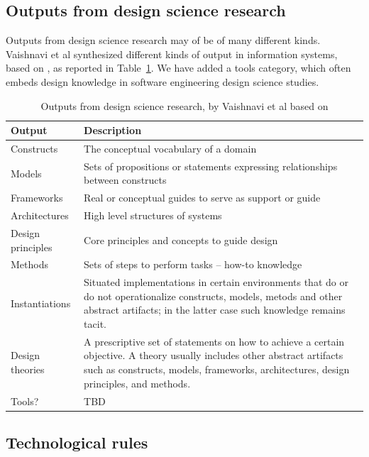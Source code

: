 \documentclass[graybox]{svmult}
\begin{document}
\subsection{Outputs from design science research}
\label{sec:outputs}
Outputs from design science research may of be of many different kinds. Vaishnavi et al \cite{Vaishnavi} synthesized different kinds of output in information systems, based on \cite{March1995} \cite{gregor_positioning_2013}, as reported in Table~\ref{tab:output}. We have added a tools category, which often embeds design knowledge in software engineering design science studies. 
\begin{table}[t]
\caption{Outputs from design science research, by Vaishnavi et al \cite{Vaishnavi} based on \cite{March1995} \cite{gregor_positioning_2013}}
\begin{center}
\begin{tabular}{lp{8cm}}
\textbf{Output}& \textbf{Description}\\
\hline
Constructs & The conceptual vocabulary of a domain\\
Models & Sets of propositions or statements expressing relationships between constructs\\
Frameworks & Real or conceptual guides to serve as support or guide\\
Architectures & High level structures of systems\\
Design principles & Core principles and concepts to guide design\\
Methods & Sets of steps to perform tasks -- how-to knowledge\\
Instantiations & Situated implementations in certain environments that do or do not operationalize constructs, models, metods and other abstract artifacts; in the latter case such knowledge remains tacit.\\
Design theories& A prescriptive set of statements on how to achieve a certain objective. A theory usually includes other abstract artifacts such as constructs, models, frameworks, architectures, design principles, and methods.\\
Tools?&TBD\\
\hline
\end{tabular}
\end{center}
\label{tab:output}
\end{table}%




\subsection{Technological rules}
\label{sec:technologicalrules}
\end{document}
